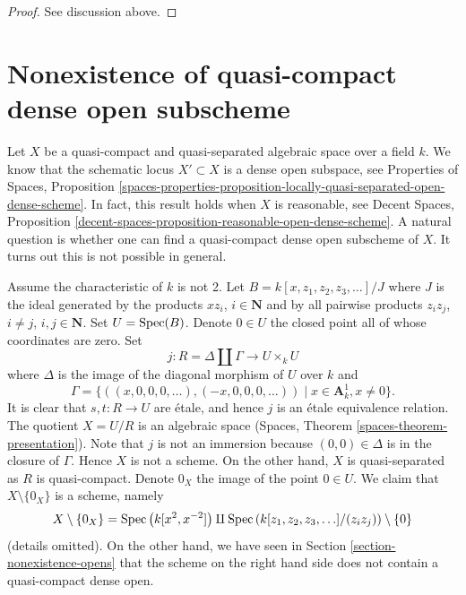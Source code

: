 \begin{proof}
See discussion above.
\end{proof}







\section{Nonexistence of quasi-compact dense open subscheme}
\label{section-nonexistence-qc-dense-open-subscheme}

\noindent
Let $X$ be a quasi-compact and quasi-separated algebraic space over a field
$k$. We know that the schematic locus $X' \subset X$ is a dense open
subspace, see
Properties of Spaces, Proposition
\ref{spaces-properties-proposition-locally-quasi-separated-open-dense-scheme}.
In fact, this result holds when $X$ is reasonable, see
Decent Spaces, Proposition
\ref{decent-spaces-proposition-reasonable-open-dense-scheme}.
A natural question is whether one can find a quasi-compact dense
open subscheme of $X$. It turns out this is not possible in general.

\medskip\noindent
Assume the characteristic of $k$ is not 2.
Let $B = k[x, z_1, z_2, z_3, \ldots]/J$ where $J$ is the ideal generated by
the products $xz_i$, $i \in \mathbf{N}$ and by all pairwise products
$z_iz_j$, $i \not = j$, $i, j \in \mathbf{N}$. Set $U = \mathop{\mathrm{Spec}}(B)$.
Denote $0 \in U$ the closed point all of whose coordinates are zero.
Set
$$
j : R = \Delta \amalg \Gamma \longrightarrow U \times_k U
$$
where $\Delta$ is the image of the diagonal morphism of $U$ over $k$ and
$$
\Gamma = \{((x, 0, 0, 0, \ldots), (-x, 0, 0, 0, \ldots))
\mid x \in \mathbf{A}^1_k, x \not = 0\}.
$$
It is clear that $s, t : R \to U$ are \'etale, and hence
$j$ is an \'etale equivalence relation. The quotient $X = U/R$
is an algebraic space (Spaces, Theorem \ref{spaces-theorem-presentation}).
Note that $j$ is not an immersion because
$(0, 0) \in \Delta$ is in the closure of $\Gamma$.
Hence $X$ is not a scheme. On the other hand, $X$ is quasi-separated
as $R$ is quasi-compact. Denote $0_X$ the image of the point $0 \in U$.
We claim that $X \setminus \{0_X\}$ is a scheme, namely
$$
X \setminus \{0_X\} =
\mathop{\mathrm{Spec}}\left(k[x^2, x^{-2}]\right) \amalg
\mathop{\mathrm{Spec}}\left(k[z_1, z_2, z_3, \ldots]/(z_iz_j)\right) \setminus \{0\}
$$
(details omitted). On the other hand, we have seen in
Section \ref{section-nonexistence-opens} that the scheme
on the right hand side does not contain
a quasi-compact dense open.

